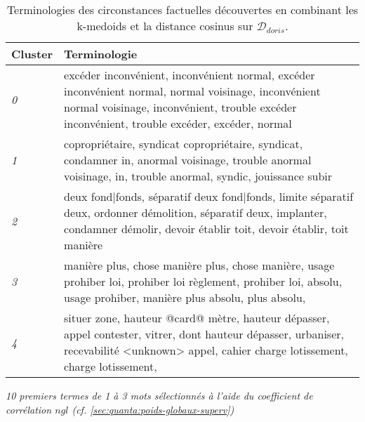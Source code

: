 \begin{table}[ht]
	\centering \scriptsize
	\begin{tabular}{|l|p{}|}
		\hline
		\textbf{Cluster} & \textbf{Terminologie} \\ \hline
		\textit{0} & excéder inconvénient, inconvénient normal, excéder inconvénient normal, normal voisinage, inconvénient normal voisinage, inconvénient, trouble excéder inconvénient, trouble excéder, excéder, normal
		\\ \hline
		\textit{1} & copropriétaire, syndicat copropriétaire, syndicat, condamner in, anormal voisinage, trouble anormal voisinage, in, trouble anormal, syndic, jouissance subir
		\\ \hline
		\textit{2} & deux fond|fonds, séparatif deux fond|fonds, limite séparatif deux, ordonner démolition, séparatif deux, implanter, condamner démolir, devoir établir toit, devoir établir, toit manière
		\\ \hline
		\textit{3} & manière plus, chose manière plus, chose manière, usage prohiber loi, prohiber loi règlement, prohiber loi, absolu, usage prohiber, manière plus absolu, plus absolu, 
		\\ \hline
		\textit{4} & situer zone, hauteur @card@ mètre, hauteur dépasser, appel contester, vitrer, dont hauteur dépasser, urbaniser, recevabilité <unknown> appel, cahier charge lotissement, charge lotissement, 
		\\ \hline
	\end{tabular}
	
	\textit{10 premiers termes de 1 à 3 mots sélectionnés à l'aide du coefficient de corrélation $ngl$ (cf. \ref{sec:quanta:poids-globaux-superv})}
	\caption{Terminologies des circonstances factuelles découvertes en combinant les k-medoids et la distance cosinus sur $\mathcal{D}_{doris}$.}\label{tab:similarite:terminologie-clusters-doris}
\end{table}


